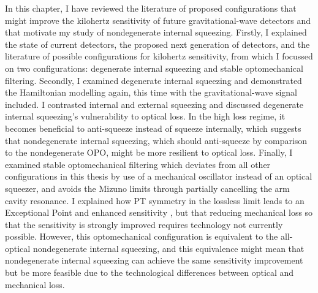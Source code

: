In this chapter, I have reviewed the literature of proposed configurations that might improve the kilohertz sensitivity of future gravitational-wave detectors and that motivate my study of nondegenerate internal squeezing. Firstly, I explained the state  of current detectors, the proposed next generation of detectors, and the literature of possible configurations for kilohertz sensitivity, from which I focussed on two configurations: degenerate internal squeezing and stable optomechanical filtering. Secondly, I examined degenerate internal squeezing and demonstrated the Hamiltonian modelling again, this time with the gravitational-wave signal included. I contrasted internal and external squeezing and discussed degenerate internal squeezing's vulnerability to optical loss. In the high loss regime, it becomes beneficial to anti-squeeze instead of squeeze internally, which suggests that nondegenerate internal squeezing, which should anti-squeeze by comparison to the nondegenerate OPO, might be more resilient to optical loss. 
Finally, I examined stable optomechanical filtering which deviates from all other configurations in this thesis by use of a mechanical oscillator instead of an optical squeezer, and avoids the Mizuno limits through partially cancelling the arm cavity resonance. I explained how PT symmetry in the lossless limit leads to an Exceptional Point and enhanced sensitivity , but that reducing mechanical loss so that the sensitivity is strongly improved requires technology not currently possible. However, this optomechanical configuration is equivalent to the all-optical nondegenerate internal squeezing, and this equivalence might mean that nondegenerate internal squeezing can achieve the same sensitivity improvement but be more feasible due to the technological differences between optical and mechanical loss.


